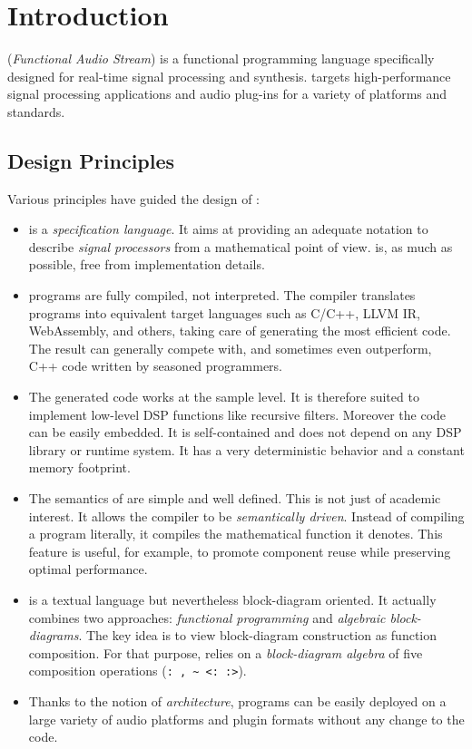 \chapter{Introduction}
\label{introduction}

\faust (\textit{Functional Audio Stream}) is a functional programming language specifically designed for real-time signal processing and synthesis.  \faust targets high-performance signal processing applications and audio plug-ins for a variety of platforms and standards. 

\section{Design Principles} 

Various principles have guided the design of \faust :

\begin{itemize}

\item \faust is a \textit{specification language}. It aims at providing an adequate notation to describe \textit{signal processors} from a mathematical point of view. \faust is, as much as possible, free from implementation details. 

\item \faust programs are fully compiled, not interpreted. The compiler translates \faust programs into equivalent target languages such as C/C++, LLVM IR, WebAssembly, and others, taking care of generating the most efficient code. The result can generally compete with, and sometimes even outperform, C++ code written by seasoned programmers.

\item The generated code works at the sample level. It is therefore suited to implement low-level DSP functions like recursive filters. Moreover the code can be easily embedded. It is self-contained and does not depend on any DSP library or runtime system. It has a very deterministic behavior and a constant memory footprint. 

\item The semantics of \faust are simple and well defined. This is not just of academic interest. It allows the \faust compiler to be \emph{semantically driven}. Instead of compiling a program literally, it compiles the mathematical function it denotes. This feature is useful, for example, to promote component reuse while preserving optimal performance.  

\item \faust is a textual language but nevertheless block-diagram oriented. It actually combines two approaches: \textit{functional programming} and \textit{algebraic block-diagrams}. The key idea is to view block-diagram construction as function composition. For that purpose, \faust relies on a \emph{block-diagram algebra} of five composition operations (\lstinline': , ~ <: :>').

\item Thanks to the notion of \textit{architecture}, \faust programs can be easily deployed on a large variety of audio platforms and plugin formats without any change to the \faust code.

\end{itemize}

